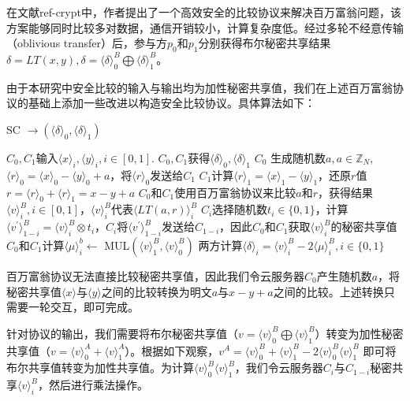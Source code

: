 在文献ref-crypt中，作者提出了一个高效安全的比较协议来解决百万富翁问题，该方案能够同时比较多对数据，通信开销较小，计算复杂度低。经过多轮不经意传输（oblivious transfer）后，参与方$p_0$和$p_1$分别获得布尔秘密共享结果$\delta = LT(x, y) ,\delta = \langle \delta \rangle^B_0 \bigoplus \langle \delta \rangle^B_1$。

由于本研究中安全比较的输入与输出均为加性秘密共享值，我们在上述百万富翁协议的基础上添加一些改进以构造安全比较协议。具体算法如下：

\begin{algorithm}[htbp]
    \renewcommand{\algorithmicrequire}{\textbf{输入:}}
    \renewcommand{\algorithmicensure}{\textbf{输出:}}
    \caption{SC $\rightarrow (\langle \delta \rangle_0, \langle \delta \rangle_1)$}
    \label{alg_sc}
    \begin{algorithmic}[1]
        \REQUIRE $C_0,C_1$输入$\langle x \rangle_i, \langle y \rangle_i, i\in [0,1]$.
        \ENSURE $C_0,C_1$获得$\langle \delta\rangle_0, \langle \delta\rangle_1$
        \STATE $C_0$ 生成随机数$a, a\in \mathbb{Z}_N$, $\langle r \rangle_0=\langle x \rangle_0-\langle y\rangle_0+a$，将$\langle r \rangle_0$发送给$C_1$
        \STATE $C_1$计算$\langle r \rangle_1 = \langle x \rangle_1-\langle y\rangle_1$，还原$r$值$r=\langle r \rangle_0 + \langle r \rangle_1 = x-y+a$
        \STATE $C_0$和$C_1$使用百万富翁协议来比较$a$和$r$，获得结果$\langle v \rangle_i^B, i\in[0,1]$，$\langle v \rangle_i^B$代表$\langle LT(a,r)\rangle_i^B$
        \STATE $C_i$选择随机数$t_i \in \{0,1\}$，计算$\langle v^{'}\rangle_{1-i}^B=\langle v \rangle_i^B \otimes  t_i$，$C_i$将$\langle v^{'}\rangle_{1-i}^B$发送给$C_{1-i}$，因此$C_0$和$C_1$获取$\langle v \rangle_i^B$的秘密共享值
        \STATE $C_0$和$C_1$计算$\langle\mu \rangle_i^b \leftarrow$ MUL$(\langle v\rangle_1^B,\langle v\rangle_0^B)$
        \STATE 两方计算$ \langle \delta \rangle_i= \langle v \rangle_i^B -  2\langle\mu \rangle_i^B,i\in\{0, 1\}$

    \end{algorithmic}
\end{algorithm}

百万富翁协议无法直接比较秘密共享值，因此我们令云服务器$C_0$产生随机数$a$，将秘密共享值$\langle x \rangle$与$\langle y\rangle$之间的比较转换为明文$a$与$x-y+a$之间的比较。上述转换只需要一轮交互，即可完成。

针对协议的输出，我们需要将布尔秘密共享值（$v=\langle v\rangle^B_0 \bigoplus \langle v\rangle^B_1$）转变为加性秘密共享值（$v=\langle v\rangle^A_0+\langle v \rangle^A_1$）。根据如下观察，$v^A=\langle v\rangle^B_0+\langle v\rangle^B_1 - 2\langle v\rangle^B_0 \langle v\rangle^B_1$ 即可将布尔共享值转变为加性共享值。为计算$\langle v\rangle^B_0 \langle v\rangle^B_1$，我们令云服务器$C_i$与$C_{1-i}$秘密共享$\langle v \rangle_i^B$，然后进行乘法操作。


